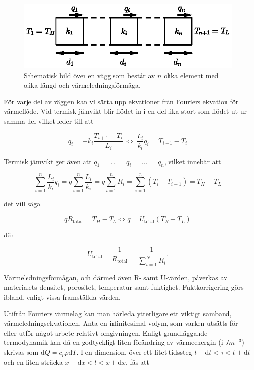 \begin{figure}[hpbt]
\centering
\includegraphics[scale=1.2]{images/wall.eps}
\caption{Schematisk bild över en vägg som består av $n$ olika element med olika
längd och värmeledningsförmåga.}\label{fig:staticwallmethod:wall}
\end{figure}

För varje del av väggen kan vi sätta upp ekvationer från Fouriers ekvation för värmeflöde. Vid termisk jämvikt blir flödet in i en del lika stort som flödet ut ur samma del vilket leder till att

\begin{equation}
\label{eq:staticwallmethod:rod}
q_i = -k_i\frac{T_{i+1}-T_{i}}{L_i} \, \Leftrightarrow \, \frac{L_i}{k_i}q_i = T_{i+1}-T_{i}
\end{equation}

Termisk jämvikt ger även att $q_1 = \, ... \, = q_i = \, ... \, = q_n$, vilket innebär att

\begin{equation}
\sum_{i=1}^n \frac{L_i}{k_i}q_i = q\sum_{i=1}^n \frac{L_i}{k_i} = q\sum_{i=1}^n R_i = \sum_{i=1}^n \left( T_{i}-T_{i+1} \right) = T_H - T_L 
\end{equation}

det vill säga

\begin{equation}
q R_\text{total} = T_H - T_L \Leftrightarrow q = U_\text{total} \left( T_H - T_L \right)
\end{equation}

där

\begin{equation}
U_\text{total} = \frac{1}{R_\text{total}} = \frac{1}{\sum_{i=1}^N R_i}.
\end{equation}

Värmeledningsförmågan, och därmed även R- samt U-värden, påverkas av materialets densitet, porositet, temperatur samt fuktighet. Fuktkorrigering görs ibland, enligt vissa framställda värden.

Utifrån Fouriers värmelag kan man härleda ytterligare ett viktigt samband, värmeledningsekvationen. Anta en infinitesimal volym, som varken utsätts för eller utför något arbete relativt omgivningen. Enligt grundläggande termodynamik kan då en godtyckligt liten förändring av värmeenergin (i $\unit{J m^{-3}}$) skrivas som $\mathrm{d}Q = c_p \rho \mathrm{d}T$.  I en dimension, över ett litet tidssteg $t-\mathrm{d}t< \tau < t+\mathrm{d}t$ och en liten sträcka $x-\mathrm{d}x < l < x+\mathrm{d}x$, fås att

